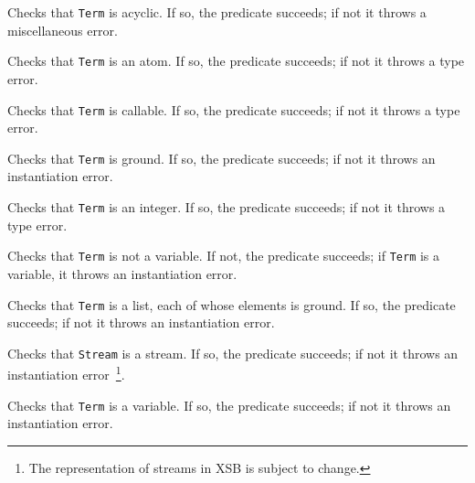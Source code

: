 \begin{description}
%
Checks that {\tt Term} is acyclic.  If so, the predicate succeeds;
if not it throws a miscellaneous error.

%
Checks that {\tt Term} is an atom.  If so, the predicate succeeds;
if not it throws a type error.

%
Checks that {\tt Term} is callable.  If so, the predicate succeeds; if
not it throws a type error.

%
Checks that {\tt Term} is ground.  If so, the predicate succeeds;
if not it throws an instantiation error.

%
Checks that {\tt Term} is an integer.  If so, the predicate succeeds;
if not it throws a type error.

%
Checks that {\tt Term} is not a variable.  If not, the predicate succeeds;
if {\tt Term} is a variable,  it throws an instantiation error.

%
Checks that {\tt Term} is a list, each of whose elements is ground.
If so, the predicate succeeds; if not it throws an instantiation
error.
	    
%


%
Checks that {\tt Stream} is a stream.  If so, the predicate succeeds;
if not it throws an instantiation error~\footnote{The representation
of streams in XSB is subject to change.}.

%
Checks that {\tt Term} is a variable.  If so, the predicate succeeds;
if not it throws an instantiation error.

\end{description}

